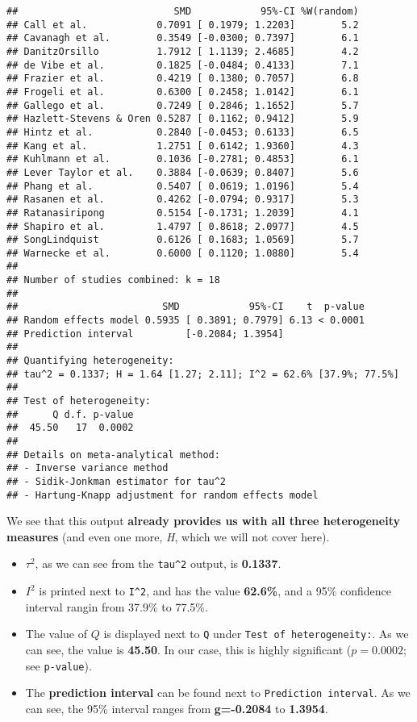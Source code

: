 \documentclass[]{book}
\theoremstyle{definition}
\theoremstyle{definition}
\theoremstyle{definition}
\theoremstyle{remark}
\begin{document}
\begin{verbatim}
##                           SMD            95%-CI %W(random)
## Call et al.            0.7091 [ 0.1979; 1.2203]        5.2
## Cavanagh et al.        0.3549 [-0.0300; 0.7397]        6.1
## DanitzOrsillo          1.7912 [ 1.1139; 2.4685]        4.2
## de Vibe et al.         0.1825 [-0.0484; 0.4133]        7.1
## Frazier et al.         0.4219 [ 0.1380; 0.7057]        6.8
## Frogeli et al.         0.6300 [ 0.2458; 1.0142]        6.1
## Gallego et al.         0.7249 [ 0.2846; 1.1652]        5.7
## Hazlett-Stevens & Oren 0.5287 [ 0.1162; 0.9412]        5.9
## Hintz et al.           0.2840 [-0.0453; 0.6133]        6.5
## Kang et al.            1.2751 [ 0.6142; 1.9360]        4.3
## Kuhlmann et al.        0.1036 [-0.2781; 0.4853]        6.1
## Lever Taylor et al.    0.3884 [-0.0639; 0.8407]        5.6
## Phang et al.           0.5407 [ 0.0619; 1.0196]        5.4
## Rasanen et al.         0.4262 [-0.0794; 0.9317]        5.3
## Ratanasiripong         0.5154 [-0.1731; 1.2039]        4.1
## Shapiro et al.         1.4797 [ 0.8618; 2.0977]        4.5
## SongLindquist          0.6126 [ 0.1683; 1.0569]        5.7
## Warnecke et al.        0.6000 [ 0.1120; 1.0880]        5.4
## 
## Number of studies combined: k = 18
## 
##                         SMD            95%-CI    t  p-value
## Random effects model 0.5935 [ 0.3891; 0.7979] 6.13 < 0.0001
## Prediction interval         [-0.2084; 1.3954]              
## 
## Quantifying heterogeneity:
## tau^2 = 0.1337; H = 1.64 [1.27; 2.11]; I^2 = 62.6% [37.9%; 77.5%]
## 
## Test of heterogeneity:
##      Q d.f. p-value
##  45.50   17  0.0002
## 
## Details on meta-analytical method:
## - Inverse variance method
## - Sidik-Jonkman estimator for tau^2
## - Hartung-Knapp adjustment for random effects model
\end{verbatim}

We see that this output \textbf{already provides us with all three
heterogeneity measures} (and even one more, \emph{H}, which we will not
cover here).

\begin{itemize}
\item
  \(\tau^{2}\), as we can see from the \texttt{tau\^{}2} output, is
  \textbf{0.1337}.
\item
  \(I^{2}\) is printed next to \texttt{I\^{}2}, and has the value
  \textbf{62.6\%}, and a 95\% confidence interval rangin from 37.9\% to
  77.5\%.
\item
  The value of \(Q\) is displayed next to \texttt{Q} under
  \texttt{Test\ of\ heterogeneity:}. As we can see, the value is
  \textbf{45.50}. In our case, this is highly significant (\(p=0.0002\);
  see \texttt{p-value}).
\item
  The \textbf{prediction interval} can be found next to
  \texttt{Prediction\ interval}. As we can see, the 95\% interval ranges
  from \textbf{g=-0.2084} to \textbf{1.3954}.
\end{itemize}
\end{document}
